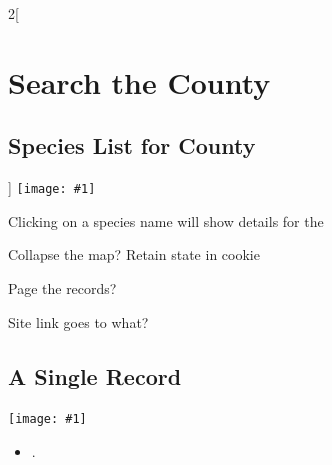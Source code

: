 \documentclass[a4paper,12pt,landscape]{article}
\newcommand{\wireframe}[1]{\texttt{[image: \#1]}\clearpage}
\begin{document}
\begin{multicols*}{2}[%
  \section{Search the County}%
  \subsection{Species List for County}%
]
\wireframe{./wireframes/Records__SingleSpeciesForCounty.png}%

Clicking on a species name will show details for the 

\begin{todolist}
  \item Collapse the map? Retain state in cookie
  \item Page the records?
  \item Site link goes to what?
\end{todolist}

\clearpage
\subsection{A Single Record}

\wireframe{./wireframes/Records__SingleRecord.png}%

\begin{itemize}
  \item .
\end{itemize}

\end{multicols*}
\end{document}
